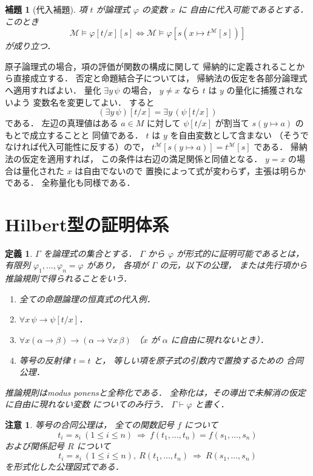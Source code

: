 \documentclass[a5paper,10pt,onecolumn]{jsarticle}
\makeatletter
\theoremstyle{mathnotetheorem}
\newtheorem{definition}[theorem]{定義}
\newtheorem{lemma}[theorem]{補題}
\newtheorem{remark}[theorem]{注意}
\renewcommand{\proofname}{証明}
\renewenvironment{proof}[1][\proofname]{%
  \par\pushQED{\qed}\normalfont\topsep4\p@\@plus2\p@\relax
  \trivlist\item[\hskip\labelsep\bfseries #1]\ignorespaces
}{\popQED\endtrivlist\@endpefalse}
\makeatother
\begin{document}
\begin{lemma}[代入補題]\label{lem:substitution}
項 $t$ が論理式 $\varphi$ の変数 $x$ に
自由に代入可能であるとする．
このとき
\[
 \mathcal M\models\varphi[t/x][s]
 \iff
 \mathcal M\models\varphi[s(x\mapsto t^{\mathcal M}[s])]
\]
が成り立つ．
\end{lemma}
\begin{proof}
原子論理式の場合，項の評価が関数の構成に関して
帰納的に定義されることから直接成立する．
否定と命題結合子については，
帰納法の仮定を各部分論理式へ適用すればよい．
量化 $\exists y\,\psi$ の場合，
$y\ne x$ なら $t$ は $y$ の量化に捕獲されないよう
変数名を変更してよい．
すると
\[
 (\exists y\,\psi)[t/x]=\exists y\,(\psi[t/x])
\]
である．
左辺の真理値はある $a\in M$ に対して
$\psi[t/x]$ が割当て $s(y\mapsto a)$ のもとで成立することと
同値である．
$t$ は $y$ を自由変数として含まない
（そうでなければ代入可能性に反する）ので，
$t^{\mathcal M}[s(y\mapsto a)]=t^{\mathcal M}[s]$ である．
帰納法の仮定を適用すれば，
この条件は右辺の満足関係と同値となる．
$y=x$ の場合は量化された $x$ は自由でないので
置換によって式が変わらず，主張は明らかである．
全称量化も同様である．
\end{proof}

\section{Hilbert型の証明体系}

\begin{definition}
$\Gamma$ を論理式の集合とする．
$\Gamma$ から $\varphi$ が\emph{形式的に証明可能}であるとは，
有限列 $\varphi_1,\dots,\varphi_n=\varphi$ があり，
各項が $\Gamma$ の元，以下の公理，
または先行項から推論規則で得られることをいう．
\begin{enumerate}
\item 全ての命題論理の恒真式の代入例．
\item $\forall x\,\psi\to\psi[t/x]$．
\item $\forall x(\alpha\to\beta)\to
 (\alpha\to\forall x\,\beta)$
（$x$ が $\alpha$ に自由に現れないとき）．
\item 等号の反射律 $t=t$ と，
等しい項を原子式の引数内で置換するための
合同公理．
\end{enumerate}
推論規則はmodus ponensと全称化である．
全称化は，その導出で未解消の仮定に自由に現れない変数
についてのみ行う．
$\Gamma\vdash\varphi$ と書く．
\end{definition}

\begin{remark}
等号の合同公理は，
全ての関数記号 $f$ について
\[
 t_i=s_i\ (1\le i\le n)\ \Longrightarrow\
 f(t_1,\dots,t_n)=f(s_1,\dots,s_n)
\]
および関係記号 $R$ について
\[
 t_i=s_i\ (1\le i\le n),\ R(t_1,\dots,t_n)
 \ \Longrightarrow\ R(s_1,\dots,s_n)
\]
を形式化した公理図式である．
\end{remark}
\end{document}
